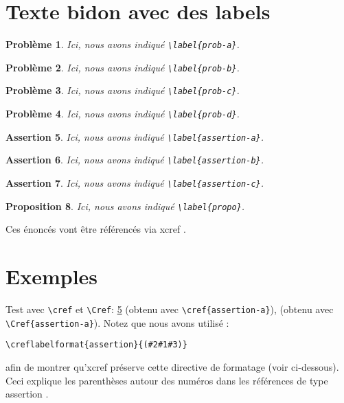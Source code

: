\documentclass[french]{article}
\newtheorem{problem}{Problème}
\newtheorem{assertion}[problem]{Assertion}
\newtheorem{proposition}[problem]{Proposition}
\let\fxcref=\xcreffrenchwrapper
\begin{document}
\section{Texte bidon avec des labels}

\begin{problem}\label{prob-a}
Ici, nous avons indiqué \verb|\label{prob-a}|.
\end{problem}
\begin{problem}\label{prob-b}
Ici, nous avons indiqué \verb|\label{prob-b}|.
\end{problem}
\begin{problem}\label{prob-c}
Ici, nous avons indiqué \verb|\label{prob-c}|.
\end{problem}
\begin{problem}\label{prob-d}
Ici, nous avons indiqué \verb|\label{prob-d}|.
\end{problem}
\begin{assertion}\label{assertion-a}
Ici, nous avons indiqué \verb|\label{assertion-a}|.
\end{assertion}
\begin{assertion}\label{assertion-b}
Ici, nous avons indiqué \verb|\label{assertion-b}|.
\end{assertion}
\begin{assertion}\label{assertion-c}
Ici, nous avons indiqué \verb|\label{assertion-c}|.
\end{assertion}
\begin{proposition}\label{propo}
Ici, nous avons indiqué \verb|\label{propo}|.
\end{proposition}

Ces énoncés vont être référencés via \textsf{xcref} \fxcref{sec-exemples}.

\section{Exemples}
\label{sec-exemples}

Test avec \verb|\cref| et \verb|\Cref|: \cref{assertion-a} (obtenu avec
\verb|\cref{assertion-a}|),  (obtenu avec
\verb|\Cref{assertion-a}|). Notez que nous avons utilisé :
\begin{verbatim}
\creflabelformat{assertion}{(#2#1#3)}
\end{verbatim}
afin de montrer qu'\textsf{xcref} préserve cette directive de formatage (voir
ci-dessous). Ceci explique les parenthèses autour des numéros dans les
références de type \og assertion \fg.
\end{document}
